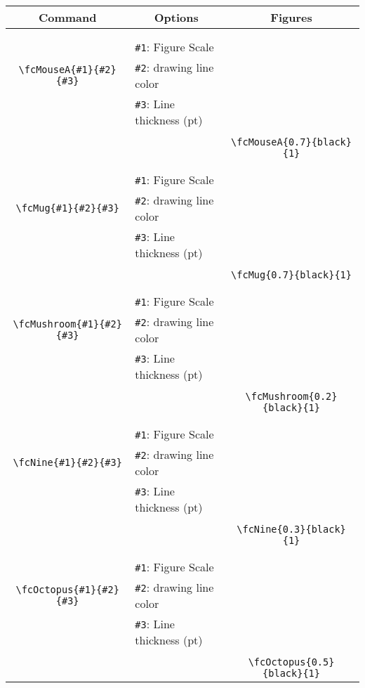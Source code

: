 \documentclass{article}
\begin{document}
\begin{table}[H]\centering\begin{tabular}{|c|l|c|}\hline {\bf Command}& \multicolumn{1}{c|}{{\bf Options}} & {\bf Figures}\\  \hline	&&\multirow{5}{*}{\fcMouseA{0.7}{black}{1}}\\	&&\\	&\verb|#1|: Figure Scale &\\	\verb|\fcMouseA{#1}{#2}{#3}|&	\verb|#2|: drawing line color &\\	&\verb|#3|: Line thickness (pt) &\\ &&\\&&	\verb|\fcMouseA{0.7}{black}{1}|\\\hline 	
	&&\multirow{5}{*}{\fcMug{0.7}{black}{1}}\\	&&\\	&\verb|#1|: Figure Scale &\\	\verb|\fcMug{#1}{#2}{#3}|&	\verb|#2|: drawing line color &\\	&\verb|#3|: Line thickness (pt) &\\ &&\\&&	\verb|\fcMug{0.7}{black}{1}|\\\hline 	
	&&\multirow{5}{*}{\fcMushroom{0.2}{black}{1}}\\	&&\\	&\verb|#1|: Figure Scale &\\	\verb|\fcMushroom{#1}{#2}{#3}|&	\verb|#2|: drawing line color &\\	&\verb|#3|: Line thickness (pt) &\\ &&\\&&	\verb|\fcMushroom{0.2}{black}{1}|\\\hline 	
	&&\multirow{5}{*}{\fcNine{0.3}{black}{1}}\\	&&\\	&\verb|#1|: Figure Scale &\\	\verb|\fcNine{#1}{#2}{#3}|&	\verb|#2|: drawing line color &\\	&\verb|#3|: Line thickness (pt) &\\ &&\\&&	\verb|\fcNine{0.3}{black}{1}|\\\hline 	
	&&\multirow{5}{*}{\fcOctopus{0.5}{black}{1}}\\	&&\\	&\verb|#1|: Figure Scale &\\	\verb|\fcOctopus{#1}{#2}{#3}|&	\verb|#2|: drawing line color &\\	&\verb|#3|: Line thickness (pt) &\\ &&\\&&	\verb|\fcOctopus{0.5}{black}{1}|\\\hline 	

\end{tabular}
\end{table}
\end{document}
